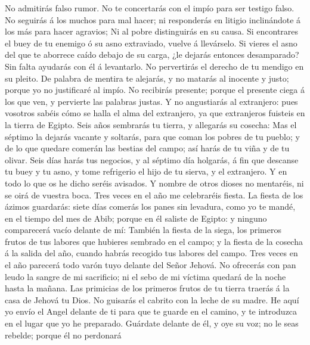  No admitirás falso rumor. No te concertarás con el impío
para ser testigo falso.  No seguirás á los muchos para mal
hacer; ni responderás en litigio inclinándote á los más para hacer
agravios;  Ni al pobre distinguirás en su causa.
 Si encontrares el buey de tu enemigo ó su asno
extraviado, vuelve á llevárselo.  Si vieres el asno del
que te aborrece caído debajo de su carga, ¿le dejarás entonces
desamparado? Sin falta ayudarás con él á levantarlo.  No
pervertirás el derecho de tu mendigo en su pleito.  De
palabra de mentira te alejarás, y no matarás al inocente y justo; porque
yo no justificaré al impío.  No recibirás presente; porque
el presente ciega á los que ven, y pervierte las palabras justas.
 Y no angustiarás al extranjero: pues vosotros sabéis cómo
se halla el alma del extranjero, ya que extranjeros fuisteis en la
tierra de Egipto.  Seis años sembrarás tu tierra, y
allegarás su cosecha:  Mas el séptimo la dejarás vacante
y soltarás, para que coman los pobres de tu pueblo; y de lo que quedare
comerán las bestias del campo; así harás de tu viña y de tu olivar.
 Seis días harás tus negocios, y al séptimo día holgarás,
á fin que descanse tu buey y tu asno, y tome refrigerio el hijo de tu
sierva, y el extranjero.  Y en todo lo que os he dicho
seréis avisados. Y nombre de otros dioses no mentaréis, ni se oirá de
vuestra boca.  Tres veces en el año me celebraréis
fiesta.  La fiesta de los ázimos guardarás: siete días
comerás los panes sin levadura, como yo te mandé, en el tiempo del mes
de Abib; porque en él saliste de Egipto: y ninguno comparecerá vacío
delante de mí:  También la fiesta de la siega, los
primeros frutos de tus labores que hubieres sembrado en el campo; y la
fiesta de la cosecha á la salida del año, cuando habrás recogido tus
labores del campo.  Tres veces en el año parecerá todo
varón tuyo delante del Señor Jehová.  No ofrecerás con
pan leudo la sangre de mi sacrificio; ni el sebo de mi víctima quedará
de la noche hasta la mañana.  Las primicias de los
primeros frutos de tu tierra traerás á la casa de Jehová tu Dios. No
guisarás el cabrito con la leche de su madre.  He aquí yo
envío el Angel delante de ti para que te guarde en el camino, y te
introduzca en el lugar que yo he preparado.  Guárdate
delante de él, y oye su voz; no le seas rebelde; porque él no perdonará
